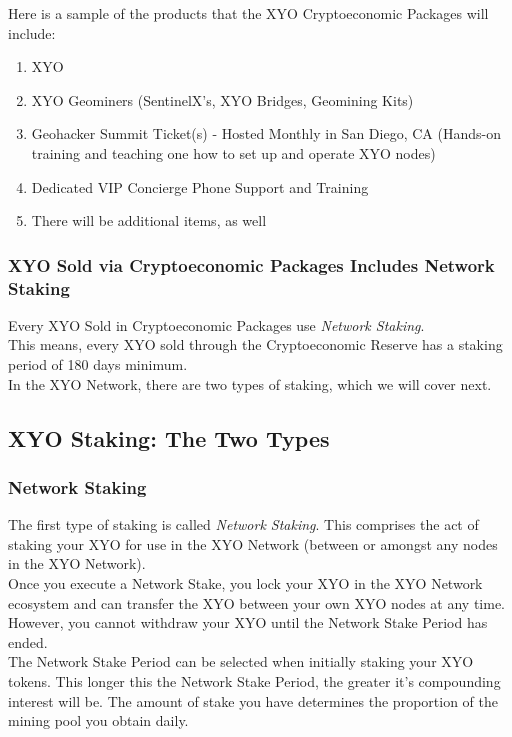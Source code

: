 \documentclass{article}
\begin{document}
Here is a sample of the products that the XYO Cryptoeconomic Packages will include:

\begin{enumerate}
  \item XYO
  \item XYO Geominers (SentinelX's, XYO Bridges, Geomining Kits)
  \item Geohacker Summit Ticket(s) - Hosted Monthly in San Diego, CA (Hands-on training and teaching one how to set up and operate XYO nodes)
  \item Dedicated VIP Concierge Phone Support and Training
  \item There will be additional items, as well
\end{enumerate}

\subsubsection{XYO Sold via Cryptoeconomic Packages Includes Network Staking}

Every XYO Sold in Cryptoeconomic Packages use \textit{Network Staking}.\\

This means, every XYO sold through the Cryptoeconomic Reserve has a staking period of 180 days minimum.\\

In the XYO Network, there are two types of staking, which we will cover next.

\subsection{XYO Staking: The Two Types}

\subsubsection{Network Staking}

The first type of staking is called \textit{Network Staking}. This comprises the act of staking your XYO for use in the XYO Network (between or amongst any nodes in the XYO Network).\\

Once you execute a Network Stake, you lock your XYO in the XYO Network ecosystem and can transfer the XYO between your own XYO nodes at any time. However, you cannot withdraw your XYO until the Network Stake Period has ended.\\

The Network Stake Period can be selected when initially staking your XYO tokens. This longer this the Network Stake Period, the greater it's compounding interest will be. The amount of stake you have determines the proportion of the mining pool you obtain daily.\\
\end{document}
